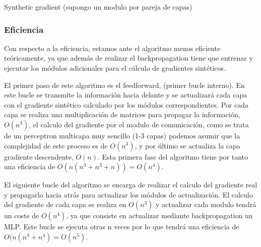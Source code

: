 \begin{algorithm}[H]
   \caption{Synthetic gradient (supongo un modulo por pareja de capas)}
\end{algorithm}

\subsubsection{Eficiencia}
Con respecto a la eficiencia, estamos ante el algoritmo menos eficiente teóricamente, ya que además de realizar el backpropagation tiene que entrenar y ejecutar los módulos adicionales para el cálculo de gradientes sintéticos. 

El primer paso de este algoritmo es el feedforward, (primer bucle interno). En este bucle se transmite la información hacia delante y se actualizará cada capa con el gradiente sintético calculado por los módulos correspondientes. Por cada capa se realiza una multiplicación de matrices para propagar la información, $O(n^{3})$, el calculo del gradiente por el modulo de comunicación, como se trata de un perceptron multicapa muy sencillo (1-3 capas) podemos asumir que la complejidad de este proceso es de $O(n^{3})$, y por último se actualiza la capa gradiente descendente, $O(n)$. Esta primera fase del algoritmo tiene por tanto una eficiencia de $O(n(n^{3}+n^{3}+n))=O(n^{4})$.

El siguiente bucle del algoritmo se encarga de realizar el calculo del gradiente real y propagarlo hacia atrás para actualizar los módulos de actualización. El calculo del gradiente de cada capa se realiza en $O(n^3)$ y actualizar cada modulo tendrá un coste de $O(n^{4})$, ya que consiste en actualizar mediante backpropagation un MLP. Este bucle se ejecuta otras n veces por lo que tendrá una eficiencia de $O(n(n^3+n^4) = O(n^5)$.

